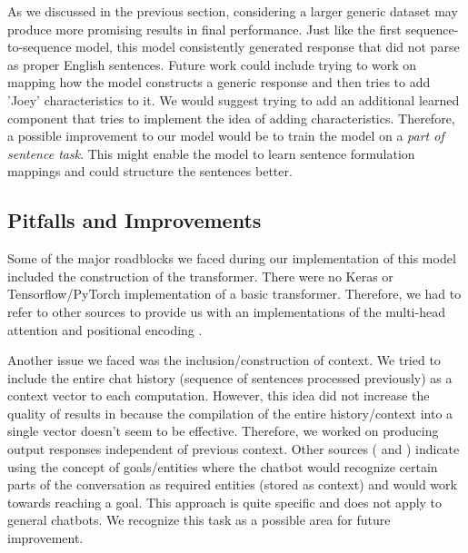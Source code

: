 As we discussed in the previous section, considering a larger generic dataset may produce more promising results in final performance.
Just like the first sequence-to-sequence model, this model consistently generated response that did not parse as proper English sentences. 
Future work could include trying to work on mapping how the model constructs a generic response and then tries to add 'Joey' characteristics to it. 
We would suggest trying to add an additional learned component that tries to implement the idea of adding characteristics.
Therefore, a possible improvement to our model would be to train the model on a \emph{part of sentence task}. 
This might enable the model to learn sentence formulation mappings and could structure the sentences better.
%

\subsection{Pitfalls and Improvements}
Some of the major roadblocks we faced during our implementation of this model included the construction of the transformer. 
There were no Keras or Tensorflow/PyTorch implementation of a basic transformer. 
Therefore, we had to refer to other sources to provide us with an implementations of the multi-head attention and positional encoding \cite{transmedium}. 

Another issue we faced was the inclusion/construction of context.
We tried to include the entire chat history (sequence of sentences processed previously) as a context vector to each computation. 
However, this idea did not increase the quality of results in \cite{DBLP:journals/corr/VaswaniSPUJGKP17} because the compilation of the entire history/context into a single vector doesn't seem to be effective. 
Therefore, we worked on producing output responses independent of previous context. 
Other sources (\cite{learndesmedium} and \cite{chatbotmedium}) indicate using the concept of goals/entities where the chatbot would recognize certain parts of the conversation as required entities (stored as context) and would work towards reaching a goal. 
This approach is quite specific and does not apply to general chatbots. 
We recognize this task as a possible area for future improvement.
